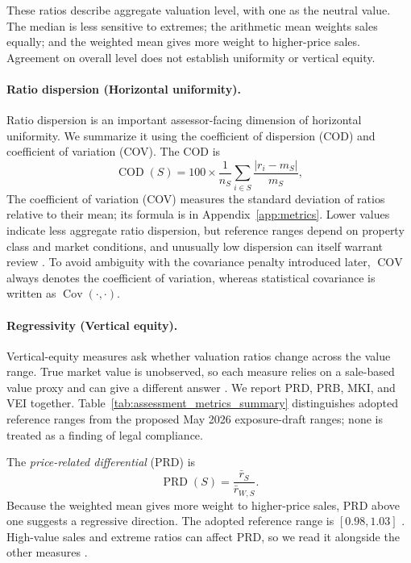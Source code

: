 \documentclass[10pt]{article}
\theoremstyle{definition}
\newcommand{\1}{\mathbf{1}}
\begin{document}
These ratios describe aggregate valuation level, with one as the neutral value. The median is less sensitive to extremes; the arithmetic mean weights sales equally; and the weighted mean gives more weight to higher-price sales. Agreement on overall level does not establish uniformity or vertical equity.


\paragraph{Ratio dispersion (Horizontal uniformity).}
Ratio dispersion is an important assessor-facing dimension of horizontal uniformity. We summarize it using the coefficient of dispersion (COD) and coefficient of variation (COV). The COD is
\begin{equation}
\label{eq:cod}
\operatorname{COD}(S)
=
100\times
\frac{1}{n_S}
\sum_{i\in S}
\frac{|r_i-m_S|}{m_S},
\end{equation}
The coefficient of variation (COV) measures the standard deviation of ratios relative to their mean; its formula is in Appendix~\ref{app:metrics}. Lower values indicate less aggregate ratio dispersion, but reference ranges depend on property class and market conditions, and unusually low dispersion can itself warrant review \cite{IAAO2013Ratio,IAAO2026ExposureRatio}.
To avoid ambiguity with the covariance penalty introduced later, $\operatorname{COV}$ always denotes the coefficient of variation, whereas statistical covariance is written as $\operatorname{Cov}(\cdot,\cdot)$.

\paragraph{Regressivity (Vertical equity).}
Vertical-equity measures ask whether valuation ratios change across the value range. True market value is unobserved, so each measure relies on a sale-based value proxy and can give a different answer \cite{IAAO2023VerticalReview,IAAO2026ExposureRatio}. We report PRD, PRB, MKI, and VEI together. Table~\ref{tab:assessment_metrics_summary} distinguishes adopted reference ranges from the proposed May 2026 exposure-draft ranges; none is treated as a finding of legal compliance.

The \emph{price-related differential} (PRD) is
\begin{equation}
\label{eq:prd}
\operatorname{PRD}(S)
=
\frac{\bar r_S}{\bar r_{W,S}}.
\end{equation}
Because the weighted mean gives more weight to higher-price sales, PRD above one suggests a regressive direction. The adopted reference range is $[0.98,1.03]$ \cite{IAAO2013Ratio}. High-value sales and extreme ratios can affect PRD, so we read it alongside the other measures \cite{IAAO2026ExposureRatio}.
\end{document}
